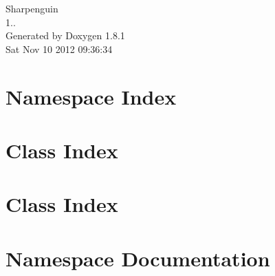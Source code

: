 \documentclass{book}
\begin{document}
\hypersetup{pageanchor=false,citecolor=blue}
\begin{titlepage}
\vspace*{7cm}
\begin{center}
{\Large Sharpenguin \\[1ex]\large 1.. }\\
\vspace*{1cm}
{\large Generated by Doxygen 1.8.1}\\
\vspace*{0.5cm}
{\small Sat Nov 10 2012 09:36:34}\\
\end{center}
\end{titlepage}
\clearemptydoublepage
{}
\tableofcontents
\clearemptydoublepage
{}
\hypersetup{pageanchor=true,citecolor=blue}
\chapter{Namespace Index}

\chapter{Class Index}

\chapter{Class Index}

\chapter{Namespace Documentation}










\end{document}
